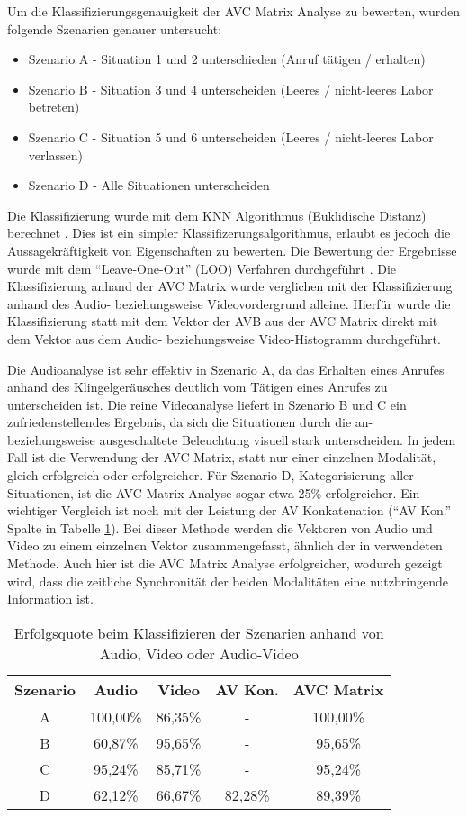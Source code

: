 Um die Klassifizierungsgenauigkeit der AVC Matrix Analyse zu bewerten, wurden folgende Szenarien genauer untersucht:
\begin{itemize}
\item Szenario A - Situation 1 und 2 unterschieden (Anruf tätigen / erhalten)
\item Szenario B - Situation 3 und 4 unterscheiden (Leeres / nicht-leeres Labor betreten)
\item Szenario C - Situation 5 und 6 unterscheiden (Leeres / nicht-leeres Labor verlassen)
\item Szenario D - Alle Situationen unterscheiden
\end{itemize}

Die Klassifizierung wurde mit dem KNN Algorithmus (Euklidische Distanz) berechnet \cite{KNN:KNN}. Dies ist ein simpler Klassifizerungsalgorithmus, erlaubt es jedoch die Aussagekräftigkeit von Eigenschaften zu bewerten. Die Bewertung der Ergebnisse wurde mit dem ``Leave-One-Out'' (LOO) Verfahren durchgeführt \cite{KNN:KNN}. Die Klassifizierung anhand der AVC Matrix wurde verglichen mit der Klassifizierung anhand des Audio- beziehungsweise Videovordergrund alleine. Hierfür wurde die Klassifizierung statt mit dem Vektor der AVB aus der AVC Matrix direkt mit dem Vektor aus dem Audio- beziehungsweise Video-Histogramm durchgeführt.    

Die Audioanalyse ist sehr effektiv in Szenario A, da das Erhalten eines Anrufes anhand des Klingelgeräusches deutlich vom Tätigen eines Anrufes zu unterscheiden ist. Die reine Videoanalyse liefert in Szenario B und C ein zufriedenstellendes Ergebnis, da sich die Situationen durch die an- beziehungsweise ausgeschaltete Beleuchtung visuell stark unterscheiden. In jedem Fall ist die Verwendung der AVC Matrix, statt nur einer einzelnen Modalität, gleich erfolgreich oder erfolgreicher. Für Szenario D, Kategorisierung aller Situationen, ist die AVC Matrix Analyse sogar etwa 25\% erfolgreicher. Ein wichtiger Vergleich ist noch mit der Leistung der AV Konkatenation (``AV Kon.'' Spalte in Tabelle \ref{FIG:AVC:Evaluate}). Bei dieser Methode werden die Vektoren von Audio und Video zu einem einzelnen Vektor zusammengefasst, ähnlich der in \cite{MJS:MMAV} verwendeten Methode. Auch hier ist die AVC Matrix Analyse erfolgreicher, wodurch gezeigt wird, dass die zeitliche Synchronität der beiden Modalitäten eine nutzbringende Information ist.



\begin{table}
\centering
\caption{Erfolgsquote beim Klassifizieren der Szenarien anhand von Audio, Video oder Audio-Video }
\begin{tabular}{ccccc}
Szenario & Audio & Video & AV Kon. & AVC Matrix \\
\hline
A & 100,00\% & 86,35\% & - & 100,00\% \\
B & 60,87\% & 95,65\% & - & 95,65\% \\
C & 95,24\% & 85,71\% & - & 95,24\% \\
D & 62,12\% & 66,67\% & 82,28\% & 89,39\% \\
\end{tabular}
\label{FIG:AVC:Evaluate}
\end{table}

